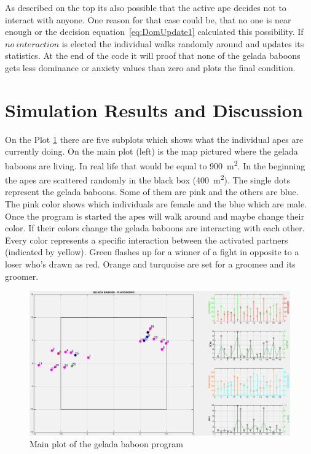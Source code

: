 \documentclass[11pt]{article}
\begin{document}
As described on the top its also possible that the active ape decides not to interact with anyone. One reason for that case could be, that no one is near enough or the decision equation~\ref{eq:DomUpdate1} calculated this possibility. If $no~interaction$ is elected the individual walks randomly around and updates its statistics. 
At the end of the code it will proof that none of the gelada baboons gets less dominance or anxiety values than zero and plots the final condition.



\section{Simulation Results and Discussion}

On the Plot \ref{fig:Plot20} there are five subplots which shows what the individual apes are currently doing. On the main plot (left) is the map pictured where the gelada baboons are living. In real life that would be equal to \SI{900}{\meter\squared}. In the beginning the apes are scattered randomly in the black box (\SI{400}{\meter\squared}). The single dots represent the gelada baboons. Some of them are pink and the others are blue. The pink color shows which individuals are female and the blue which are male. Once the program is started the apes will walk around and maybe change their color. If their colors change the gelada baboons are interacting with each other. Every color represents a specific interaction between the activated partners (indicated by yellow). Green flashes up for a winner of a fight in opposite to a loser who's drawn as red. Orange and turquoise are set for a groomee and its groomer.

\begin{figure}
\label{fig:Plot20}
\centering
\includegraphics[scale=0.37]{Photos/mainplot_FG}
\caption{Main plot of the gelada baboon program}
\end{figure}
\end{document}
